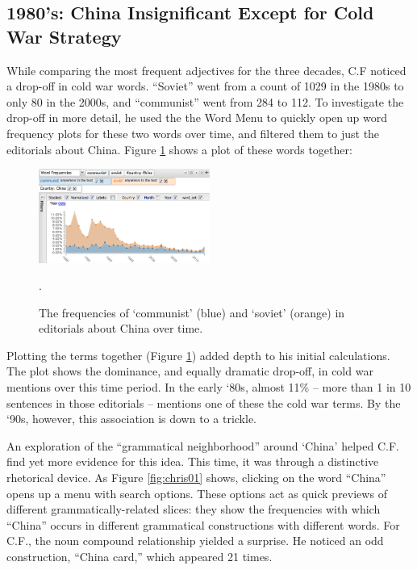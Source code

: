 \documentclass{sig-alternate}
\begin{document}
\subsection{1980's: China Insignificant Except for Cold War Strategy}
While comparing the most frequent adjectives for the three decades, C.F noticed a drop-off in cold war words. ``Soviet''  went from  a count of 1029 in the 1980s to only 80 in the 2000s, and ``communist'' went from 284 to 112.   To investigate the drop-off in more detail, he used the the Word Menu to quickly open up word frequency plots for these two words over time, and filtered them to just the editorials about China.  Figure \ref{fig:chris04b} shows a plot of these words together:

\begin{figure}[h!]
\includegraphics[width=0.5\textwidth]{fig/chris/04b.png}
\caption{The frequencies of `communist' (blue) and `soviet' (orange) in editorials about China over time. \label{fig:chris04b}}.
\end{figure}

Plotting the terms together (Figure \ref{fig:chris04b}) added depth to his initial calculations.  The plot shows the dominance, and equally dramatic drop-off, in cold war mentions over this time period. In the early `80s, almost 11\% -- more than 1 in 10 sentences in those editorials -- mentions one of these the cold war terms. By the `90s, however, this association is down to a trickle. 

An exploration of the ``grammatical neighborhood'' around `China'  helped C.F. find yet more evidence for this idea. This time, it was through a distinctive rhetorical device. As Figure \ref{fig:chris01} shows, clicking on the word ``China'' opens up a menu with search options. These options act as quick previews of different grammatically-related slices: they show the frequencies with which ``China'' occurs in different grammatical constructions with different words.  For C.F., the noun compound relationship yielded a surprise. He noticed an odd construction, ``China card,'' which appeared 21 times.
\end{document}
